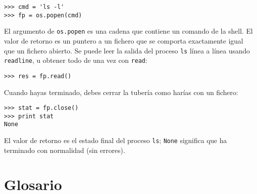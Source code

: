 
\beforeverb
\begin{verbatim}
>>> cmd = 'ls -l'
>>> fp = os.popen(cmd)
\end{verbatim}
\afterverb
%
El argumento de {\tt os.popen} es una cadena que contiene un comando de la shell. El
valor de retorno es un puntero a un fichero que se comporta exactamente igual que un fichero
abierto. Se puede leer la salida del proceso {\tt ls} línea a línea
usando {\tt readline}, u obtener todo de una vez
con {\tt read}:


\beforeverb
\begin{verbatim}
>>> res = fp.read()
\end{verbatim}
\afterverb
%
Cuando hayas terminado, debes cerrar la tubería como harías con un fichero:


\beforeverb
\begin{verbatim}
>>> stat = fp.close()
>>> print stat
None
\end{verbatim}
\afterverb
%
El valor de retorno es el estado final del proceso {\tt ls};
{\tt None} significa que ha terminado con normalidad (sin errores).

\section{Glosario}

